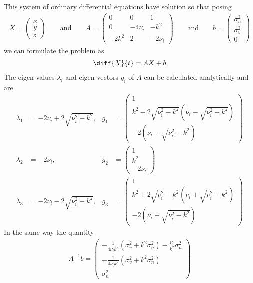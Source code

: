 \documentclass[10pt,a4paper]{article}
\begin{document}
This system of ordinary differential equations have solution so that posing
\begin{align}
X=\begin{pmatrix}x\\y\\z\end{pmatrix}\qquad\text{and}\qquad
A=\begin{pmatrix}0&0&1\\0&{-}4\nu_i&{-}k^2\\{-}2k^2&2&-2\nu_i\end{pmatrix}
\qquad\text{and}\qquad
b=\begin{pmatrix}\sigma_n^2\\\sigma_v^2\\0\end{pmatrix}\nonumber
\end{align}
we can formulate the problem as
\begin{align}
\diff{X}{t}=AX+b
\end{align}
The eigen values $\lambda_i$ and eigen vectors $g_i$ of $A$ can be calculated
analytically and are
\begin{align}
\lambda_1 &= -2\nu_i+2\sqrt{\nu_i^2-k^2}, &
g_1 & = \begin{pmatrix}1\\
k^2-2\sqrt{\nu_i^2-k^2}\left(\nu_i-\sqrt{\nu_i^2-k^2}\right)\\
-2\left(\nu_i-\sqrt{\nu_i^2-k^2}\right)\end{pmatrix}\\
\lambda_2 &= -2\nu_i, &
g_2 & = \begin{pmatrix}1\\k^2\\-2\nu_i\end{pmatrix}\\
\lambda_3 &= -2\nu_i-2\sqrt{\nu_i^2-k^2}, &
g_3 & = \begin{pmatrix}1\\
k^2+2\sqrt{\nu_i^2-k^2}\left(\nu_i+\sqrt{\nu_i^2-k^2}\right)\\
-2\left(\nu_i+\sqrt{\nu_i^2-k^2}\right)\end{pmatrix}
\end{align}
In the same way the quantity
\begin{align}
A^{-1} b = \begin{pmatrix}
-\frac{1}{4\nu_ik^2}\left(\sigma_v^2+k^2\sigma_n^2\right)-
\frac{\nu_i}{k^2}\sigma_n^2\\
-\frac{1}{4\nu_ik^2}\left(\sigma_v^2+k^2\sigma_n^2\right)\\
\sigma_n^2
\end{pmatrix}
\end{align}
\end{document}
